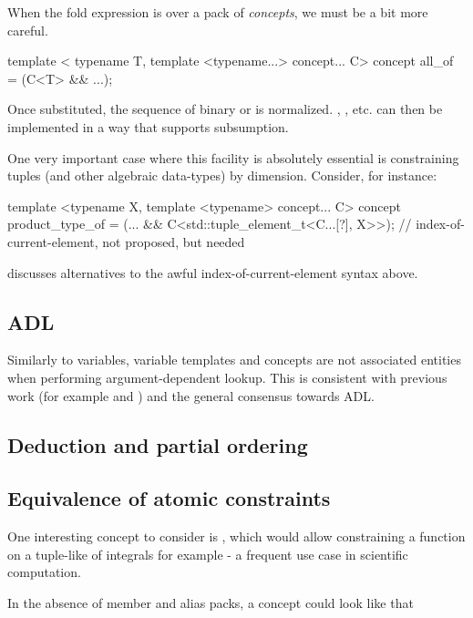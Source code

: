 \documentclass{wg21}
\begin{document}
When the fold expression is over a pack of \emph{concepts}, we must be a bit more careful.

\begin{colorblock}
template <
    typename T,
    template <typename...> concept... C>
concept all_of = (C<T> && ...);
\end{colorblock}

Once substituted, the sequence of binary \tcode{\&\&} or \tcode{||} is normalized.
, , etc. can then be implemented in a way that supports subsumption.

One very important case where this facility is absolutely essential is constraining tuples (and other algebraic data-types) by dimension. Consider, for instance:

\begin{colorblock}
template <typename X, template <typename> concept... C>
concept product_type_of = (... && C<std::tuple_element_t<C...[?], X>>);
//   index-of-current-element, not proposed, but needed  ~~~~~~~
\end{colorblock}

 discusses alternatives to the awful index-of-current-element syntax above.

\subsection{ADL}

Similarly to variables, variable templates and concepts are not associated entities when performing argument-dependent lookup.
This is consistent with previous work (for example  and ) and the general consensus towards ADL.

\subsection{Deduction and partial ordering}

\subsection{Equivalence of atomic constraints}

One interesting concept to consider is , which would allow constraining a function on a tuple-like of integrals for example - a frequent use case in scientific computation.

In the absence of member and alias packs, a  concept could look like that
\end{document}
